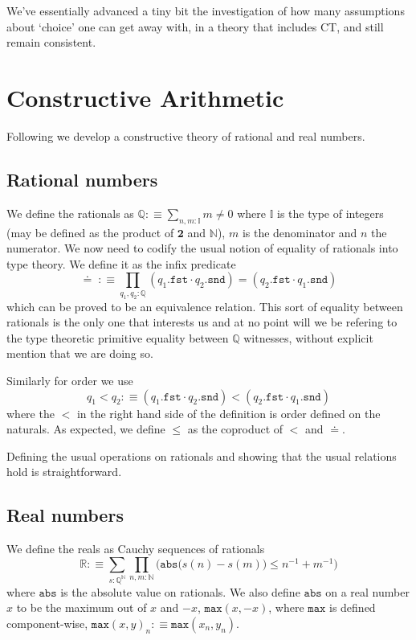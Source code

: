 \documentclass[12pt]{report}
\theoremstyle{definition}
\begin{document}
We've essentially advanced a tiny bit the investigation of how many assumptions about `choice' one can get away with, in a theory that includes CT, and still remain consistent. 
\appendix
\appendixpage
\addappheadtotoc
\chapter{Constructive Arithmetic}
Following \cite{bridges_richman_1987_2} we develop a constructive theory of rational and real numbers.
\section{Rational numbers}
We define the rationals as $\mathbb{Q} :\equiv \sum_{n,m: \mathbb{I}}m \neq 0$ where $\mathbb{I}$ is the type of integers (may be defined as the product of $\mathbf{2}$ and $\mathbb{N}$), $m$ is the denominator and $n$ the numerator. 
We now need to codify the usual notion of equality of rationals into type theory. 
We define it as the infix predicate
$$\doteq\; :\equiv \prod_{q_1, q_2 : \mathbb{Q}} (q_1.\mathtt{fst} \cdot q_2.\mathtt{snd}) = (q_2.\mathtt{fst} \cdot q_1.\mathtt{snd})$$
which can be proved to be an equivalence relation. 
This sort of equality between rationals is the only one that interests us and at no point will we be refering to the type theoretic primitive equality between $\mathbb{Q}$ witnesses, without explicit mention that we are doing so. 

Similarly for order we use 
$$q_1 < q_2 :\equiv (q_1.\mathtt{fst} \cdot q_2.\mathtt{snd}) < (q_2.\mathtt{fst} \cdot q_1.\mathtt{snd})$$ 
where the $<$ in the right hand side of the definition is order defined on the naturals. 
As expected, we define $\leq$ as the coproduct of $<$ and $\doteq$. 

Defining the usual operations on rationals and showing that the usual relations hold is straightforward. 

\section{Real numbers}
We define the reals as Cauchy sequences of rationals
$$\mathbb{R} :\equiv \sum_{s: \mathbb{Q}^\mathbb{N}}\prod_{n,m : \mathbb{N}} \Big( \mathtt{abs}\big(s(n) - s(m) \big) \leq n^{-1} + m^{-1} \Big)$$
where $\mathtt{abs}$ is the absolute value on rationals. 
We also define $\mathtt{abs}$ on a real number $x$ to be the maximum out of $x$ and $-x$, $\mathtt{max}(x,-x)$, where $\mathtt{max}$ is defined component-wise, $\mathtt{max}(x,y)_n :\equiv \mathtt{max}(x_n,y_n)$. 
\end{document}
